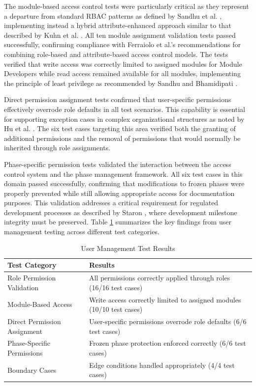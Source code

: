 The module-based access control tests were particularly critical as they represent a departure from standard RBAC patterns as defined by Sandhu et al. \cite{sandhu1998role}, implementing instead a hybrid attribute-enhanced approach similar to that described by Kuhn et al. \cite{kuhn2010adding}. All ten module assignment validation tests passed successfully, confirming compliance with Ferraiolo et al.'s \cite{ferraiolo2011policy} recommendations for combining role-based and attribute-based access control models. The tests verified that write access was correctly limited to assigned modules for Module Developers while read access remained available for all modules, implementing the principle of least privilege as recommended by Sandhu and Bhamidipati \cite{sandhu1997arbac97}.

Direct permission assignment tests confirmed that user-specific permissions effectively overrode role defaults in all test scenarios. This capability is essential for supporting exception cases in complex organizational structures as noted by Hu et al. \cite{hu2015implementing}. The six test cases targeting this area verified both the granting of additional permissions and the removal of permissions that would normally be inherited through role assignments.

Phase-specific permission tests validated the interaction between the access control system and the phase management framework. All six test cases in this domain passed successfully, confirming that modifications to frozen phases were properly prevented while still allowing appropriate access for documentation purposes. This validation addresses a critical requirement for regulated development processes as described by Staron \cite{staron2021automotive}, where development milestone integrity must be preserved. Table \ref{tab:rbac-test-results} summarizes the key findings from user management testing across different test categories.

\begin{table}[h]
    \centering
    \caption{User Management Test Results}
    \label{tab:rbac-test-results}
    \begin{tabular}{|p{3cm}|p{5cm}|}
    \hline
    \textbf{Test Category} & \textbf{Results} \\
    \hline
    Role Permission Validation & All permissions correctly applied through roles (16/16 test cases) \\
    \hline
    Module-Based Access & Write access correctly limited to assigned modules (10/10 test cases) \\
    \hline
    Direct Permission Assignment & User-specific permissions overrode role defaults (6/6 test cases) \\
    \hline
    Phase-Specific Permissions & Frozen phase protection enforced correctly (6/6 test cases) \\
    \hline
    Boundary Cases & Edge conditions handled appropriately (4/4 test cases) \\
    \hline
    \end{tabular}
\end{table}

